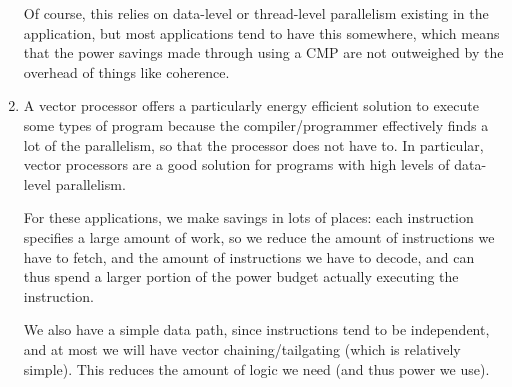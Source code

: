 \begin{enumerate}[label=(\alph*)]
    Of course, this relies on data-level or thread-level parallelism existing in the application, but most applications tend to have this somewhere, which means that the power savings made through using a CMP are not outweighed by the overhead of things like coherence.

  \item
    A vector processor offers a particularly energy efficient solution to execute some types of program because the compiler/programmer effectively finds a lot of the parallelism, so that the processor does not have to. In particular, vector processors are a good solution for programs with high levels of data-level parallelism.

    For these applications, we make savings in lots of places: each instruction specifies a large amount of work, so we reduce the amount of instructions we have to fetch, and the amount of instructions we have to decode, and can thus spend a larger portion of the power budget actually executing the instruction.

    We also have a simple data path, since instructions tend to be independent, and at most we will have vector chaining/tailgating (which is relatively simple). This reduces the amount of logic we need (and thus power we use).


        
\end{enumerate}


